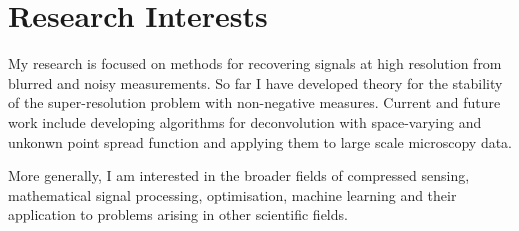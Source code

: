 \documentclass[11pt,a4paper,roman]{moderncv} %
\begin{document}


%
%
%
%
%


\makecvtitle %




\section{Research Interests}
My research is focused on methods for recovering signals at high resolution
from blurred and noisy measurements.
So far I have developed theory for the stability of the super-resolution problem 
with non-negative measures. 
Current and future work include developing algorithms for deconvolution
with space-varying and unkonwn point spread function and applying 
them to large scale microscopy data.
\newline

More generally, I am interested in the broader fields of compressed sensing, 
mathematical signal processing, optimisation, machine learning 
and their application to problems arising in other scientific fields.



\end{document}
